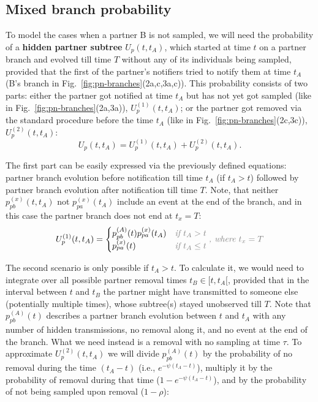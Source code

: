 \documentclass[10pt,letterpaper]{article}
\begin{document}
\subsection*{Mixed branch probability}


To model the cases when a partner B is not sampled, we will need the probability of a \textbf{hidden partner subtree} $U_p(t, t_A)$, which started at time $t$ on a partner branch and evolved till time $T$ without any of its individuals being sampled, provided that the first of the partner's notifiers tried to notify them at time $t_A$ (B's branch in Fig.~\ref{fig:pn-branches}(2a,c,3a,c)). This probability consists of two parts: either the partner got notified at time $t_A$ but has not yet got sampled (like in Fig.~\ref{fig:pn-branches}(2a,3a)), $U_p^{(1)}(t, t_A)$;  or the partner got removed via the standard procedure before the time $t_A$ (like in Fig.~\ref{fig:pn-branches}(2c,3c)), $U_p^{(2)}(t, t_A)$: 
\begin{equation}
U_p(t, t_A) = U_p^{(1)}(t, t_A) + U_p^{(2)}(t, t_A).
\end{equation} 

The first part can be easily expressed via the previously defined equations: partner branch evolution before notification till time $t_A$ (if $t_A > t$) followed by partner branch evolution after notification till time $T$. Note, that neither  $p_{pb}^{(x)}(t, t_A)$ not $p_{pa}^{(x)}(t_A)$ include an event at the end of the branch, and in this case the partner branch does not end at $t_x = T$:
\begin{equation}
U_p^{(1)}(t, t_A) = 
\begin{cases}
p_{pb}^{(A)}(t) p_{pa}^{(x)}(t_A) & \textit{\color{gray} if $t_A > t$}\\
p_{pa}^{(x)}(t) & \textit{\color{gray} if $t_A \leq t$}
\end{cases}\textit{\color{gray}, where $t_x =T$}
\end{equation} 

The second scenario is only possible if $t_A > t$. To calculate it, we would need to integrate over all possible partner removal times $t_B \in [t, t_A[$, provided that in the interval between $t$ and $t_B$ the partner might have transmitted to someone else (potentially multiple times), whose subtree(s) stayed unobserved till $T$. Note that $p_{pb}^{(A)}(t)$ describes a partner branch evolution between $t$ and $t_A$ with any number of hidden transmissions, no removal along it, and no event at the end of the branch. What we need instead is a removal with no sampling at time $\tau$. To approximate $U_p^{(2)}(t, t_A)$ we will divide $p_{pb}^{(A)}(t)$ by the probability of no removal during the time $(t_A - t)$ (i.e., $e^{-\psi(t_A - t)}$), multiply it by the probability of removal during that time ($1 - e^{-\psi(t_A - t)}$), and by the probability of not being sampled upon removal ($1 - \rho$):
\end{document}
